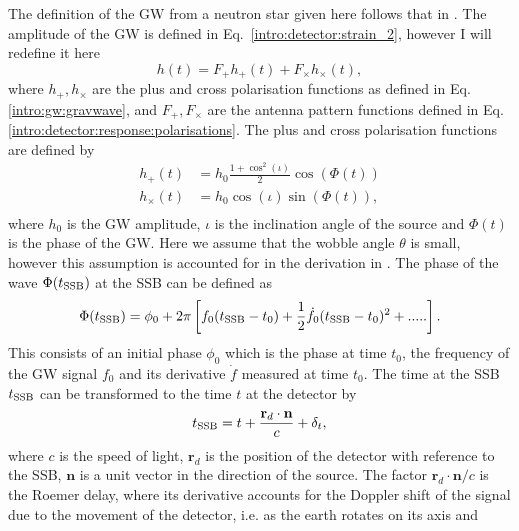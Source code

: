 The definition of the \gls{GW} from a neutron star given here follows that in
\citep{riles2017RecentSearches,schutz1998DataAnalysis,dupuis2005BayesianEstimation}.
The amplitude of the \gls{GW} is defined in Eq.~\ref{intro:detector:strain_2}, however I will redefine it here
%
\begin{equation}
\label{searchcw:model:amplitude}
h(t) = F_{+}h_{+}(t) + F_{\times}h_{\times}(t),
\end{equation}
%
where $h_{+},h_{\times}$ are the plus and cross polarisation functions as defined in
Eq.\ref{intro:gw:gravwave}, and $F_{+},F_{\times}$ are the antenna pattern
functions  defined in Eq.\ref{intro:detector:response:polarisations}. The plus and cross polarisation functions are defined by
%
\begin{equation}
\label{intro:cw:amplitudes}
    \begin{split}
        h_{+}(t) &=  h_0 \frac{1 + \cos^2{(\iota)}}{2}\cos{\left(\Phi(t)\right)} \\
        h_{\times}(t) &= h_0  \cos{(\iota)} \sin{\left( \Phi(t)\right) }, \\
    \end{split}
\end{equation}
%
where $h_0$ is the \gls{GW} amplitude, $\iota$ is the inclination angle of the source and $\Phi(t)$ is the phase of the \gls{GW}. 
Here we assume that the wobble angle $\theta$ is small,
however this assumption is accounted for in the derivation in \citep{schutz1998DataAnalysis}.
The phase of the wave $\Phi(t_{{\rm SSB}})$ at the \gls{SSB} can be defined as
%
\begin{equation}
\label{searchcw:model:phase}
    \Phi(t_{{\rm SSB}}) = \phi_0 + 2\pi\left[ f_0(t_{{\rm SSB}} - t_0) + \frac{1}{2} \dot{f_0} (t_{{\rm SSB}} - t_0)^2 + .....\right] .
\end{equation}
%
This consists of an initial phase $\phi_0$ which is the phase at time $t_0$,
the frequency of the \gls{GW} signal $f_0$ and its derivative ${\dot{f}}$ measured at
time $t_0$. The time at the \gls{SSB} $t_{{\rm SSB}}$ can be
transformed to the time $t$ at the detector by
%
\begin{equation}
	\label{searchcw:model:ssbtime}
t_{{\rm SSB}} = t + \frac{\mathbf{r}_d \cdot \mathbf{n}}{c} + \delta_t,
\end{equation}
%
where $c$ is the speed of light, $\mathbf{r}_d$ is the position of the detector with reference to the
\gls{SSB}, $\mathbf{n}$ is a unit vector in the direction of the source. The factor $\mathbf{r}_d \cdot \mathbf{n}/c$ is the Roemer delay, where its derivative accounts for the Doppler shift of the signal due to the movement of the detector, i.e. as the earth rotates on its axis and
